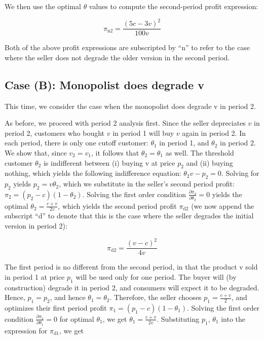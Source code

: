 \documentclass{article}
\begin{document}
We then use the optimal $\theta $ values to compute the second-period profit expression:

\begin{equation}
\pi _{\text{n2}}=\frac{(5 c-3 v)^2}{100 v}
\end{equation}

Both of the above profit expressions are subscripted by {``}n{''} to refer to the case where the seller does not degrade the older version in the
second period.

\subsection*{Case (B): Monopolist does degrade v}

This time, we consider the case when the monopolist does degrade v in period 2.

As before, we proceed with period 2 analysis first. Since the seller depreciates \(v\) in period 2, customers who bought \(v\) in period 1 will buy
\(v\) again in period 2. In each period, there is only one cutoff customer: \(\theta _1\) in period 1, and \(\theta _2\) in period 2. We show that,
since \(v_2=v_1\), it follows that \(\theta _2=\theta _1\) as well. The threshold customer \(\theta _2\) is indifferent between (i) buying v at price
\(p_2\) and (ii) buying nothing, which yields the following indifference equation: \(\theta _2v-p_2=0\). Solving for \(p_2\) yields { }\(p_2=v \theta
_2\), which we substitute in the seller{'}s second period profit: \(\pi _2=\left(p_2-c\right)\left(1-\theta _2\right)\). Solving the first order
condition \(\frac{\partial \pi _2}{\partial \theta _2}=0\) yields the optimal \(\theta _2=\frac{c+v}{2 v}\), which yields the second period profit
\(\pi _{\text{d2}}\) (we now append the subscript {``}d{''} to denote that this is the case where the seller degrades the initial version in period
2):

\begin{equation}
\pi _{\text{d2}}=\frac{(v-c)^2}{4 v}
\end{equation}

The first period is no different from the second period, in that the product v sold in period 1 at price \(p_1\) will be used only for one period.
The buyer will (by construction) degrade it in period 2, and consumers will expect it to be degraded. Hence, \(p_1=p_2\), and hence \(\theta _1=\theta
_2\). Therefore, the seller chooses \(p_1=\frac{c+v}{2}\), and optimizes their first period profit \(\pi _1=\left(p_1-c\right)\left(1-\theta _1\right)\).
Solving the first order condition \(\frac{\partial \pi _1}{\partial \theta _1}=0\) for optimal \(\theta _1\), we get \(\theta _1=\frac{c+v}{2 v}\).
Substituting \(p_1\), \(\theta _1\) into the expression for \(\pi _{\text{d1}}\), we get 
\end{document}
